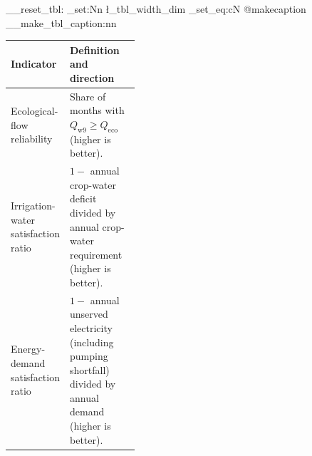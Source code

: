 \documentclass [a4paper,fleqn] {cas-dc}
\begin{document}
\noindent\begin{minipage}{\columnwidth}
\makeatletter{}\makeatother
\ExplSyntaxOn
\__reset_tbl:
\dim_set:Nn \l_tbl_width_dim { \linewidth }
\cs_set_eq:cN { @makecaption } \__make_tbl_caption:nn
\ExplSyntaxOff
\caption{System performance indicators}
\label{tab:system-performance-indicators}
\centering
\sffamily
\footnotesize
\setlength{\tabcolsep}{3pt}
\renewcommand{\arraystretch}{1.10}
\begin{tabularx}{\linewidth}{@{}>{\raggedright\arraybackslash}p{0.36\linewidth}
  >{\raggedright\arraybackslash}X@{}}
\toprule
Indicator & Definition and direction \\
\midrule
Ecological-flow reliability & Share of months with
$Q_{\mathrm{w9}}\geq Q_{\mathrm{eco}}$ (higher is better). \\
Irrigation-water satisfaction ratio & $1-$ annual crop-water deficit divided by
annual crop-water requirement (higher is better). \\
Energy-demand satisfaction ratio & $1-$ annual unserved electricity (including
pumping shortfall) divided by annual demand (higher is better). \\
\bottomrule
\end{tabularx}
\end{minipage}
\par\medskip

\end{document}
